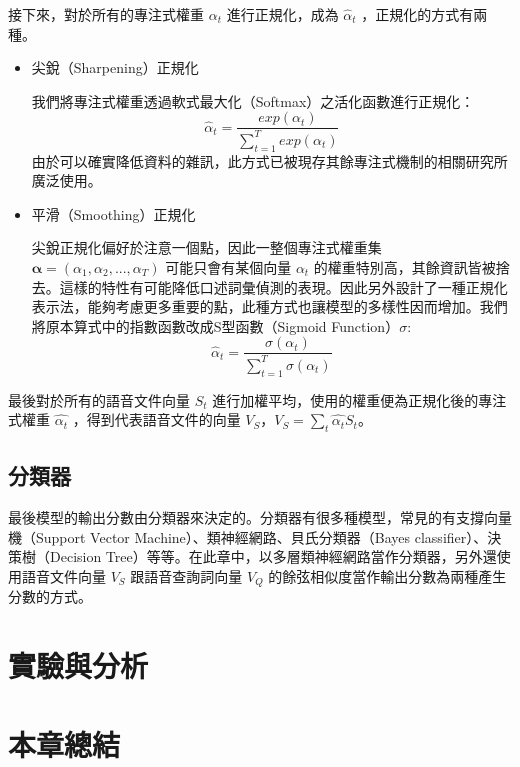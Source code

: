 接下來，對於所有的專注式權重 $\alpha_t$ 進行正規化，成為
$\hat{\alpha}_t$ ，正規化的方式有兩種。
\begin{itemize}
	\item{尖銳（Sharpening）正規化}
		
		我們將專注式權重透過軟式最大化（Softmax）之活化函數進行正規化：
		\begin{equation}
			\hat{\alpha}_t =
			\frac{exp(\alpha_t)}{\sum_{t=1}^{T} exp(\alpha_t)}
		\end{equation}
		由於可以確實降低資料的雜訊，此方式已被現存其餘專注式機制的相關研究所廣泛使用。
	\item{平滑（Smoothing）正規化}
		
		尖銳正規化偏好於注意一個點，因此一整個專注式權重集 $
		\boldsymbol{\alpha}
		= (\alpha_1,\alpha_2, ...,
		\alpha_T)$
		可能只會有某個向量 $\alpha_t$ 的權重特別高，其餘資訊皆被捨去。這樣的特性有可能降低口述詞彙偵測的表現。因此另外設計了一種正規化表示法，能夠考慮更多重要的點，此種方式也讓模型的多樣性因而增加。我們將原本算式中的指數函數改成S型函數（Sigmoid Function）$\sigma$:
		\begin{equation}
			\hat{\alpha}_t =
			\frac{\sigma(\alpha_t)}{\sum_{t=1}^{T}\sigma(\alpha_t)}
		\end{equation}

\end{itemize}

最後對於所有的語音文件向量 $S_t$
進行加權平均，使用的權重便為正規化後的專注式權重 $\hat{\alpha_t}$
，得到代表語音文件的向量 $V_S$，$V_S
= \sum_{t} \hat{\alpha_t} S_t$。
\label{ch4_doc_vec}
\subsection{分類器}
最後模型的輸出分數由分類器來決定的。分類器有很多種模型，常見的有支撐向量機（Support
Vector Machine）、類神經網路、貝氏分類器（Bayes
classifier）、決策樹（Decision
Tree）等等。在此章中，以多層類神經網路當作分類器，另外還使用語音文件向量 $V_S$
跟語音查詢詞向量 $V_Q$ 的餘弦相似度當作輸出分數為兩種產生分數的方式。
\label{ch4_classify}
\section{實驗與分析}
\section{本章總結}

